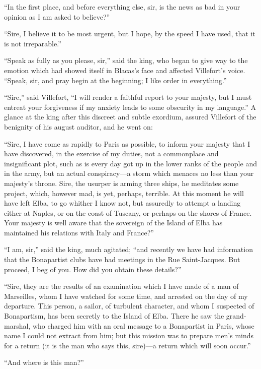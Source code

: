 “In the first place, and before everything else, sir, is the news as
bad in your opinion as I am asked to believe?”

“Sire, I believe it to be most urgent, but I hope, by the speed I have
used, that it is not irreparable.”

“Speak as fully as you please, sir,” said the king, who began to give
way to the emotion which had showed itself in Blacas’s face and
affected Villefort’s voice. “Speak, sir, and pray begin at the
beginning; I like order in everything.”

“Sire,” said Villefort, “I will render a faithful report to your
majesty, but I must entreat your forgiveness if my anxiety leads to
some obscurity in my language.” A glance at the king after this
discreet and subtle exordium, assured Villefort of the benignity of his
august auditor, and he went on:

“Sire, I have come as rapidly to Paris as possible, to inform your
majesty that I have discovered, in the exercise of my duties, not a
commonplace and insignificant plot, such as is every day got up in the
lower ranks of the people and in the army, but an actual conspiracy—a
storm which menaces no less than your majesty’s throne. Sire, the
usurper is arming three ships, he meditates some project, which,
however mad, is yet, perhaps, terrible. At this moment he will have
left Elba, to go whither I know not, but assuredly to attempt a landing
either at Naples, or on the coast of Tuscany, or perhaps on the shores
of France. Your majesty is well aware that the sovereign of the Island
of Elba has maintained his relations with Italy and France?”

“I am, sir,” said the king, much agitated; “and recently we have had
information that the Bonapartist clubs have had meetings in the Rue
Saint-Jacques. But proceed, I beg of you. How did you obtain these
details?”

“Sire, they are the results of an examination which I have made of a
man of Marseilles, whom I have watched for some time, and arrested on
the day of my departure. This person, a sailor, of turbulent character,
and whom I suspected of Bonapartism, has been secretly to the Island of
Elba. There he saw the grand-marshal, who charged him with an oral
message to a Bonapartist in Paris, whose name I could not extract from
him; but this mission was to prepare men’s minds for a return (it is
the man who says this, sire)—a return which will soon occur.”

“And where is this man?”

